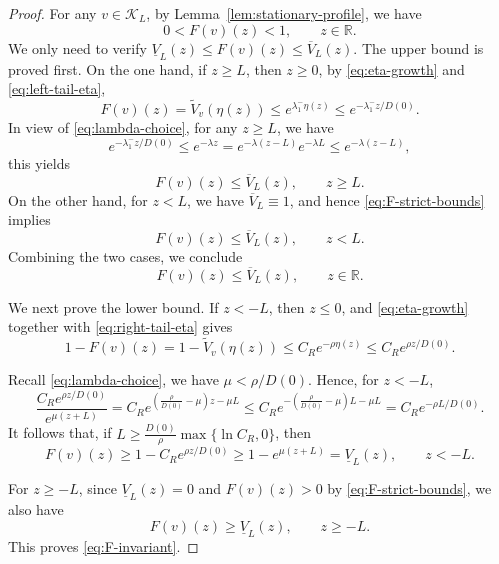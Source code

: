 \documentclass[preprint,sort&compress,final,12pt]{elsarticle}
\numberwithin{equation}{section}
\begin{document}
\begin{proof}
For any $v\in\mathcal K_L$, by Lemma~\ref{lem:stationary-profile}, we have
\begin{equation}\label{eq:F-strict-bounds}
0<F(v)(z)<1,\qquad z\in\mathbb R.
\end{equation}
We only need to verify
$\underline V_L(z)\le F(v)(z)\le \overline V_L(z)$.
The upper bound is proved first. On the one hand, if $z\ge L$, then $z\ge0$, by \eqref{eq:eta-growth} and \eqref{eq:left-tail-eta},
\begin{equation*}
F(v)(z)=\widetilde V_v(\eta(z))\le e^{\lambda_1^-\eta(z)}
\le e^{-\lambda_1^-z/D(0)}.
\end{equation*}
In view of \eqref{eq:lambda-choice}, for any $z\ge L$, we have
\begin{equation*}
e^{-\lambda_1^{-}z/D(0)}\le e^{-\lambda z}=e^{-\lambda(z-L)}e^{-\lambda L}\le e^{-\lambda(z-L)},
\end{equation*}
this yields
\begin{equation*}
F(v)(z)\le \overline V_L(z),\qquad z\ge L.
\end{equation*}
On the other hand, for $z<L$, we have $\overline V_L\equiv 1$, and hence \eqref{eq:F-strict-bounds} implies
\begin{equation*}
F(v)(z)\le \overline V_L(z),\qquad z<L.
\end{equation*}
Combining the two cases, we conclude
\begin{equation*}
F(v)(z)\le \overline V_L(z),\qquad z\in\mathbb R.
\end{equation*}

We next prove the lower bound. If $z<-L$, then $z\le0$, and \eqref{eq:eta-growth} together with \eqref{eq:right-tail-eta} gives
\begin{equation*}
1-F(v)(z)=1-\widetilde V_v(\eta(z))
\le C_Re^{-\rho\eta(z)}\le C_Re^{\rho z/D(0)}.
\end{equation*}
 
Recall \eqref{eq:lambda-choice}, we have $\mu<\rho/D(0)$. Hence, for $z<-L$,
\begin{equation*}
\frac{C_Re^{\rho z/D(0)}}{e^{\mu(z+L)}}
=C_Re^{\left(\frac{\rho}{D(0)}-\mu\right)z-\mu L}
\le C_Re^{-\left(\frac{\rho}{D(0)}-\mu\right)L-\mu L}
=C_Re^{-\rho L/D(0)}.
\end{equation*}
It follows that, if $L\ge \frac{D(0)}{\rho}\max\{\ln C_R,0\}$, then
\begin{equation*}
F(v)(z)\ge1-C_Re^{\rho z/D(0)}
\ge 1-e^{\mu(z+L)}
=\underline V_L(z),\qquad z<-L.
\end{equation*}

For $z\ge -L$, since $\underline V_L(z)=0$ and $F(v)(z)>0$ by \eqref{eq:F-strict-bounds}, we also have
\begin{equation*}
F(v)(z)\ge \underline V_L(z),\qquad z\ge -L.
\end{equation*}
This proves \eqref{eq:F-invariant}.
\end{proof}
\end{document}
